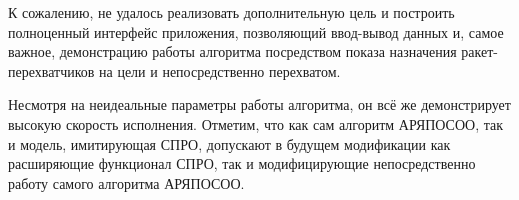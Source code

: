 К сожалению, не удалось реализовать дополнительную цель и построить полноценный интерфейс приложения, позволяющий ввод-вывод данных и, самое важное, демонстрацию работы алгоритма посредством показа назначения ракет-перехватчиков на цели и непосредственно перехватом.

Несмотря на неидеальные параметры работы алгоритма, он всё же демонстрирует высокую скорость исполнения. Отметим, что как сам алгоритм АРЯПОСОО, так и модель, имитирующая СПРО, допускают в будущем модификации как расширяющие функционал СПРО, так и модифицирующие непосредственно работу самого алгоритма АРЯПОСОО.

